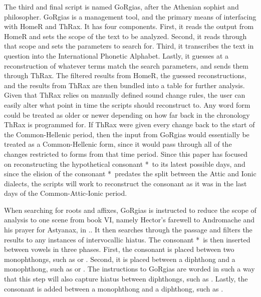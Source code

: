 The third and final script is named GoRgias, after the Athenian sophist and philosopher. GoRgias is a management tool, and the primary means of interfacing with HomeR and ThRax. It has four components. First, it reads the output from HomeR and sets the scope of the text to be analyzed. Second, it reads through that scope and sets the parameters to search for. Third, it transcribes the text in question into the International Phonetic Alphabet. Lastly, it guesses at a reconstruction of whatever terms match the search parameters, and sends them through ThRax. The filtered results from HomeR, the guessed reconstructions, and the results from ThRax are then bundled into a table for further analysis. Given that ThRax relies on manually defined sound change rules, the user can easily alter what point in time the scripts should reconstruct to. Any word form could be treated as older or newer depending on how far back in the chronology ThRax is programmed for. If ThRax were given every change back to the start of the Common-Hellenic period, then the input from GoRgias would essentially be treated as a Common-Hellenic form, since it would pass through all of the changes restricted to forms from that time period.  Since this paper has focused on reconstructing the hypothetical consonant *\w\ to its latest possible days, and since the elision of the consonant *\w\ predates the split between the Attic and Ionic dialects, the scripts will work to reconstruct the consonant as it was in the last days of the Common-Attic-Ionic period. 

 When searching for roots and affixes, GoRgias is instructed to reduce the scope of analysis to one scene from book VI, namely  Hector's farewell to Andromache and his prayer for Astyanax, in .. It then searches through the passage and filters the results to any instances of intervocallic hiatus. The consonant *\w\ is then inserted between vowels in three phases. First, the consonant is placed between two monophthongs, such as  or . Second, it is placed between a diphthong and a monophthong, such as  or . The instructions to GoRgias are worded in such a way that this step will also capture hiatus between diphthongs, such as . Lastly, the consonant is added between a monophthong and a diphthong, such as . 




